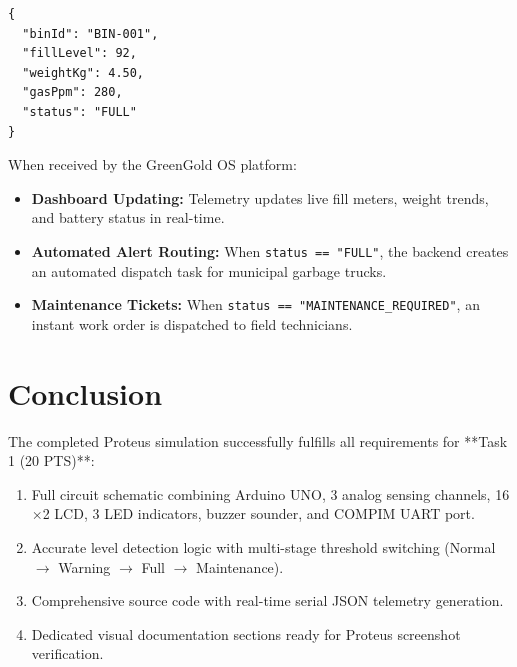 \documentclass[12pt,a4paper]{article}
\begin{document}
\begin{lstlisting}[style=arduino, language={}]
{
  "binId": "BIN-001",
  "fillLevel": 92,
  "weightKg": 4.50,
  "gasPpm": 280,
  "status": "FULL"
}
\end{lstlisting}

When received by the GreenGold OS platform:
\begin{itemize}[leftmargin=*]
    \item \textbf{Dashboard Updating:} Telemetry updates live fill meters, weight trends, and battery status in real-time.
    \item \textbf{Automated Alert Routing:} When \texttt{status == "FULL"}, the backend creates an automated dispatch task for municipal garbage trucks.
    \item \textbf{Maintenance Tickets:} When \texttt{status == "MAINTENANCE\_REQUIRED"}, an instant work order is dispatched to field technicians.
\end{itemize}

\section{Conclusion}
The completed Proteus simulation successfully fulfills all requirements for **Task 1 (20 PTS)**:
\begin{enumerate}[leftmargin=*]
    \item Full circuit schematic combining Arduino UNO, 3 analog sensing channels, 16$\times$2 LCD, 3 LED indicators, buzzer sounder, and COMPIM UART port.
    \item Accurate level detection logic with multi-stage threshold switching (Normal $\rightarrow$ Warning $\rightarrow$ Full $\rightarrow$ Maintenance).
    \item Comprehensive source code with real-time serial JSON telemetry generation.
    \item Dedicated visual documentation sections ready for Proteus screenshot verification.
\end{enumerate}
\end{document}

